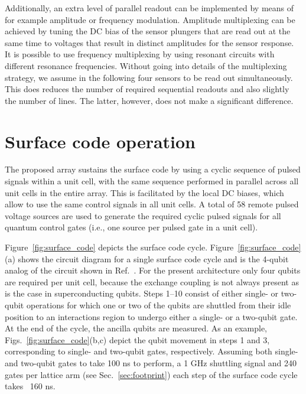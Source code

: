 \documentclass[aps,prl,reprint,superscriptaddress,floatfix]{revtex4-1}
\begin{document}
Additionally, an extra level of parallel readout can be implemented by means of for example amplitude or frequency modulation.
Amplitude multiplexing can be achieved by tuning the DC bias of the sensor plungers that are read out at the same time to voltages that result in distinct amplitudes for the sensor response.
It is possible to use frequency multiplexing by using resonant circuits with different resonance frequencies.
Without going into details of the multiplexing strategy, we assume in the following four sensors to be read out simultaneously.
This does reduces the number of required sequential readouts and also slightly the number of lines. The latter, however, does not make a significant difference.

\section{Surface code operation}
\label{sec:surface_code}
The proposed array sustains the surface code by using a cyclic sequence of pulsed signals within a unit cell, with the same sequence performed in parallel across all unit cells in the entire array.
This is facilitated by the local DC biases, which allow to use the same control signals in all unit cells.
A total of 58 remote pulsed voltage sources are used to generate the required cyclic pulsed signals for all quantum control gates (i.e., one source per pulsed gate in a unit cell).

Figure~\ref{fig:surface_code} depicts the surface code cycle. 
Figure~\ref{fig:surface_code}(a) shows the circuit diagram for a single surface code cycle and is the 4-qubit analog of the circuit shown in Ref.~\cite{Versluis2017}. For the present architecture only four qubits are required per unit cell, because the exchange coupling is not always present as is the case in superconducting qubits.
Steps 1--10 consist of either single- or two-qubit operations for which one or two of the qubits are shuttled from their idle position to an interactions region to undergo either a single- or a two-qubit gate.
At the end of the cycle, the ancilla qubits are measured.
As an example, Figs.~\ref{fig:surface_code}(b,c) depict the qubit movement in steps 1 and 3, corresponding to single- and two-qubit gates, respectively.
Assuming both single- and two-qubit gates to take 100 ns to perform, a 1 GHz shuttling signal and 240 gates per lattice arm (see Sec.~\ref{sec:footprint}) each step of the surface code cycle takes ~160 ns.
\end{document}
